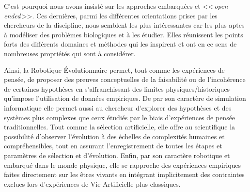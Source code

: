 C'est pourquoi nous avons insisté sur les approches embarquées et <<\,\emph{open ended}\,>>. Ces dernières, parmi les différentes orientations prises par les chercheurs de la discipline, nous semblent les plus intéressantes car les plus aptes à modéliser des problèmes biologiques et à les étudier. Elles réunissent les points forts des différents domaines et méthodes qui les inspirent et ont en ce sens de nombreuses propriétés qui sont à considérer.

Ainsi, la Robotique \'Evolutionnaire permet, tout comme les expériences de pensée, de proposer des preuves conceptuelles de la faisabilité ou de l'incohérence de certaines hypothèses en s'affranchissant des limites physiques/historiques qu'impose l'utilisation de données empiriques. De par son caractère de simulation informatique elle permet aussi au chercheur d'explorer des hypothèses et des systèmes plus complexes que ceux étudiés par le biais d'expériences de pensée traditionnelles. Tout comme la sélection artificielle, elle offre au scientifique la possibilité d'observer l'évolution à des échelles de complexités humaines et compréhensibles, tout en assurant l'enregistrement de toutes les étapes et paramètres de sélection et d'évolution. Enfin, par son caractère robotique et embarqué dans le monde physique, elle se rapproche des expériences empiriques faites directement sur les êtres vivants en intégrant implicitement des contraintes exclues lors d'expériences de Vie Artificielle plus classiques.
